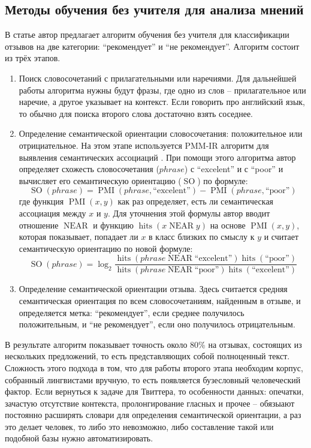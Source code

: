 \subsection{Методы обучения без учителя для анализа мнений}
В статье \cite{pang2002thumbs} автор предлагает алгоритм обучения без учителя для классификации
отзывов на две категории: ``рекомендует'' и ``не рекомендует''. Алгоритм состоит из трёх
этапов.
\begin{enumerate}
\item Поиск словосочетаний с прилагательными или наречиями. Для дальнейшей работы алгоритма нужны
  будут фразы, где одно из слов -- прилагательное или наречие, а другое указывает на контекст. Если
  говорить про английский язык, то обычно для поиска второго слова достаточно взять соседнее.
\item Определение семантической ориентации словосочетания: положительное или отрициательное. На этом
  этапе используется PMM-IR алгоритм для выявления семантических ассоциаций
  \cite{Church:1989:PWA:1075434.1075449}. При помощи этого алгоритма автор определяет схожесть словосочетания ($phrase$)
  с ``excelent'' и с ``poor'' и вычисляет его семантическую ориентацию ($\operatorname{SO}$) по формуле:
$$\operatorname{SO}(phrase) = \operatorname{PMI}(phrase, \textrm{``excelent''}) -
\operatorname{PMI}(phrase, \textrm{``poor''})$$
где функция $\operatorname{PMI}(x,y)$ как раз определяет, есть ли семантическая ассоциация между $x$ и $y$. Для уточнения этой
формулы автор вводит отношение $\operatorname{NEAR}$ и функцию $\operatorname{hits}(x
\operatorname{NEAR} y)$ на основе $\operatorname{PMI}(x,y)$, которая показывает, попадает ли
$x$ в класс близких по смыслу к $y$ и считает семантическую ориентацию  по новой формуле:
$$
\operatorname{SO}(phrase)
= \log_2 \frac
          {\operatorname{hits}(phrase \operatorname{NEAR} \textrm{``excelent''}) \operatorname{hits}(\textrm{``poor''})}
          {\operatorname{hits}(phrase \operatorname{NEAR} \textrm{``poor''}) \operatorname{hits}(\textrm{``excelent''})}
$$
\item Определение семантической ориентации отзыва. Здесь считается средняя семантическая ориентация
  по всем словосочетаниям, найденным в отзыве, и определяется метка: ``рекомендует'', если среднее
  получилось положительным, и ``не рекомендует'', если оно получилось отрицательным.
\end{enumerate}
В результате алгоритм показывает точность около 80\% на отзывах, состоящих из нескольких
предложений, то есть представляющих собой полноценный текст. Сложность этого подхода в том, что для
работы второго этапа необходим корпус, собранный лингвистами вручную, то есть появляется бузесловный
человеческий фактор. Если вернуться к задаче для Твиттера, то особенности данных: опечатки,
зачастую отсутствие контекста, пролонгирование гласных и прочее -- обязыают постоянно расширять
словари для определения семантической ориентации, а раз это делает человек, то либо это невозможно,
либо составление такой или подобной базы нужно автоматизировать.

